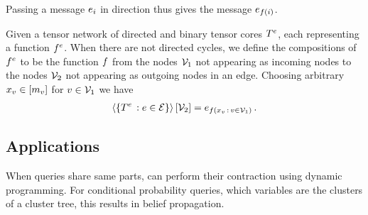 Passing a message $e_{i}$ in direction thus gives the message $e_{f(i)}$.



\begin{remark}
	Given a tensor network of directed and binary tensor cores $T^{e}$, each representing a function $f^{e}$.
	When there are not directed cycles, we define the compositions of $f^{e}$ to be the function $f$ from the nodes $\mathcal{V}_1$ not appearing as incoming nodes to the nodes $\mathcal{V}_2$ not appearing as outgoing nodes in an edge.
	Choosing arbitrary $x_{v}\in[m_{v}]$ for $v\in\mathcal{V}_1$ we have
	\begin{align*}
		\left\langle \{T^{e} \, : e\in\mathcal{E}\}\right\rangle \left[ \mathcal{V}_2 \right] = e_{f(x_{v} \, : \, v\in\mathcal{V}_1)}\, . 
	\end{align*}
\end{remark}




\subsection{Applications}

When queries share same parts, can perform their contraction using dynamic programming.
For conditional probability queries, which variables are the clusters of a cluster tree, this results in belief propagation.


